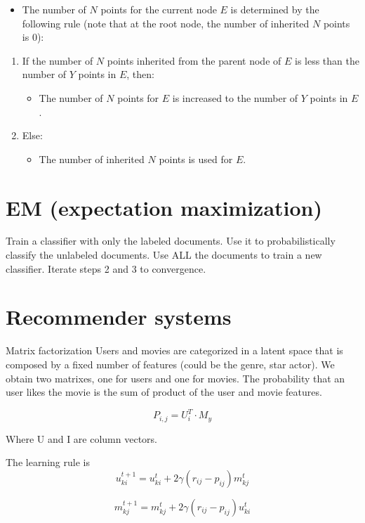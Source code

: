 \documentclass[10pt,oneside,a4paper]{article}
\begin{document}
\begin{itemize}
    \item The number of \( N \) points for the current node \( E \) is determined by the following rule (note that at the root node, the number of inherited \( N \) points is \( 0 \)):
\end{itemize}

\begin{enumerate}
    \item If the number of \( N \) points inherited from the parent node of \( E \) is less than the number of \( Y \) points in \( E \), then:
          \begin{itemize}
              \item The number of \( N \) points for \( E \) is increased to the number of \( Y \) points in \( E \).
          \end{itemize}
    \item Else:
          \begin{itemize}
              \item The number of inherited \( N \) points is used for \( E \).
          \end{itemize}
\end{enumerate}

\section{EM (expectation maximization)}
Train a classifier with only the labeled
documents. Use it to probabilistically classify the
unlabeled documents. Use ALL the documents to train a new
classifier. Iterate steps 2 and 3 to convergence.


\section{Recommender systems}
Matrix factorization
Users and movies are categorized in a latent space that is composed by a fixed number of features (could be the genre, star actor). We obtain two matrixes, one for users and one for movies. The probability that an user likes the movie is the sum of product of the user and movie features.

\[
    P_{i,j} = U_i^T \cdot M_y
\]

Where U and I are column vectors.

The learning rule is
\[
    u_{ki}^{t+1} = u_{ki}^t + 2\gamma (r_{ij} - p_{ij})m_{kj}^t
\]

\[
    m_{kj}^{t+1} = m_{kj}^t + 2\gamma (r_{ij} - p_{ij})u_{ki}^t
\]
\end{document}
